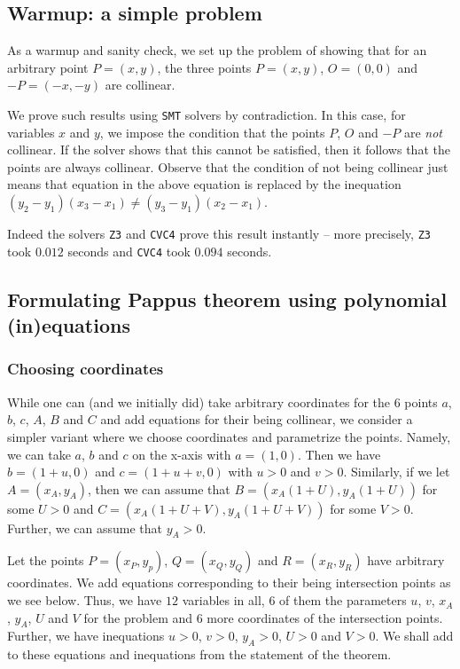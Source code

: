 \documentclass{amsart}
\theoremstyle{plain}
\theoremstyle{definition}
\theoremstyle{remark}
\begin{document}
\subsection{Warmup: a simple problem}\label{a-simple-problem}

As a warmup and sanity check, we set up the problem of showing that for
an arbitrary point \(P = (x, y)\), the three points \(P=(x, y)\),
\(O=(0, 0)\) and \(-P=(-x, -y)\) are collinear.

We prove such results using \texttt{SMT} solvers by contradiction. In this case,
for variables \(x\) and \(y\), we impose the condition that the points
\(P\), \(O\) and \(-P\) are \emph{not} collinear. If the solver shows
that this cannot be satisfied, then it follows that the points are
always collinear. Observe that the condition of not being collinear just
means that equation in the above equation is replaced by the inequation
\((y_2 - y_1)(x_3 - x_1) \neq (y_3 - y_1)(x_2 - x_1)\).

Indeed the solvers \texttt{Z3} and \texttt{CVC4} prove this result instantly -- more
precisely, \texttt{Z3} took \(0.012\) seconds and \texttt{CVC4} took \(0.094\) seconds.

\subsection{Formulating Pappus theorem using polynomial (in)equations}

\subsubsection{Choosing coordinates}

While one can (and we initially did) take arbitrary coordinates for the
\(6\) points \(a\), \(b\), \(c\), \(A\), \(B\) and \(C\) and add
equations for their being collinear, we consider a simpler variant where
we choose coordinates and parametrize the points. Namely, we can take
\(a\), \(b\) and \(c\) on the x-axis with \(a = (1, 0)\). Then we have
\(b = (1 + u, 0)\) and \(c = (1 + u + v, 0)\) with \(u>0\) and \(v>0\).
Similarly, if we let \(A = (x_A, y_A)\), then we can assume that
\(B = (x_A(1+ U), y_A(1 + U))\) for some \(U > 0\) and
\(C = (x_A(1+ U + V), y_A(1 + U + V))\) for some \(V > 0\). Further, we
can assume that \(y_A > 0\).

Let the points \(P= (x_P, y_p)\), \(Q = (x_Q, y_Q)\) and
\(R= (x_R, y_R)\) have arbitrary coordinates. We add equations
corresponding to their being intersection points as we see below. Thus,
we have \(12\) variables in all, \(6\) of them the parameters \(u\),
\(v\), \(x_A\), \(y_A\), \(U\) and \(V\) for the problem and \(6\) more
coordinates of the intersection points. Further, we have inequations
\(u >0\), \(v >0\), \(y_A >0\), \(U > 0\) and \(V >0\). We shall add to
these equations and inequations from the statement of the theorem.
\end{document}
